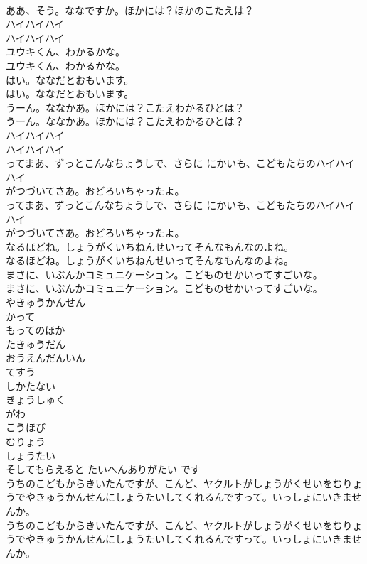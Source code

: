 \documentclass[8pt]{extreport}
\begin{document}
\begin{CJK}{UTF8}{min}
\\	ああ、そう。ななですか。ほかには？ほかのこたえは？
\\	ハイハイハイ
\\	ハイハイハイ
\\	ユウキくん、わかるかな。
\\	ユウキくん、わかるかな。
\\	はい。ななだとおもいます。
\\	はい。ななだとおもいます。
\\	うーん。ななかあ。ほかには？こたえわかるひとは？
\\	うーん。ななかあ。ほかには？こたえわかるひとは？
\\	ハイハイハイ
\\	ハイハイハイ
\\	ってまあ、ずっとこんなちょうしで、さらに にかいも、こどもたちのハイハイハイ
\\	がつづいてさあ。おどろいちゃったよ。
\\	ってまあ、ずっとこんなちょうしで、さらに にかいも、こどもたちのハイハイハイ
\\	がつづいてさあ。おどろいちゃったよ。
\\	なるほどね。しょうがくいちねんせいってそんなもんなのよね。
\\	なるほどね。しょうがくいちねんせいってそんなもんなのよね。
\\	まさに、いぶんかコミュニケーション。こどものせかいってすごいな。
\\	まさに、いぶんかコミュニケーション。こどものせかいってすごいな。
\\	やきゅうかんせん
\\	かって
\\	もってのほか
\\	たきゅうだん
\\	おうえんだんいん
\\	てすう
\\	しかたない
\\	きょうしゅく
\\	がわ
\\	こうほび
\\	むりょう
\\	しょうたい
\\	そしてもらえると たいへんありがたい です
\\	うちのこどもからきいたんですが、こんど、ヤクルトがしょうがくせいをむりょうでやきゅうかんせんにしょうたいしてくれるんですって。いっしょにいきませんか。
\\	うちのこどもからきいたんですが、こんど、ヤクルトがしょうがくせいをむりょうでやきゅうかんせんにしょうたいしてくれるんですって。いっしょにいきませんか。

\end{CJK}
\end{document}
